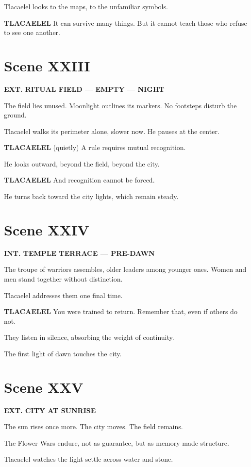 \documentclass[12pt]{article}
\begin{document}
Tlacaelel looks to the maps, to the unfamiliar symbols.

\textbf{TLACAELEL}  
It can survive many things.  
But it cannot teach those who refuse to see one another.

\section*{Scene XXIII}

\textbf{EXT. RITUAL FIELD --- EMPTY --- NIGHT}

The field lies unused. Moonlight outlines its markers. No footsteps disturb the ground.

Tlacaelel walks its perimeter alone, slower now. He pauses at the center.

\textbf{TLACAELEL}  
(quietly)  
A rule requires mutual recognition.

He looks outward, beyond the field, beyond the city.

\textbf{TLACAELEL}  
And recognition cannot be forced.

He turns back toward the city lights, which remain steady.

\section*{Scene XXIV}

\textbf{INT. TEMPLE TERRACE --- PRE-DAWN}

The troupe of warriors assembles, older leaders among younger ones. Women and men stand together without distinction.

Tlacaelel addresses them one final time.

\textbf{TLACAELEL}  
You were trained to return.  
Remember that, even if others do not.

They listen in silence, absorbing the weight of continuity.

The first light of dawn touches the city.

\section*{Scene XXV}

\textbf{EXT. CITY AT SUNRISE}

The sun rises once more. The city moves. The field remains.

The Flower Wars endure, not as guarantee, but as memory made structure.

Tlacaelel watches the light settle across water and stone.
\end{document}
